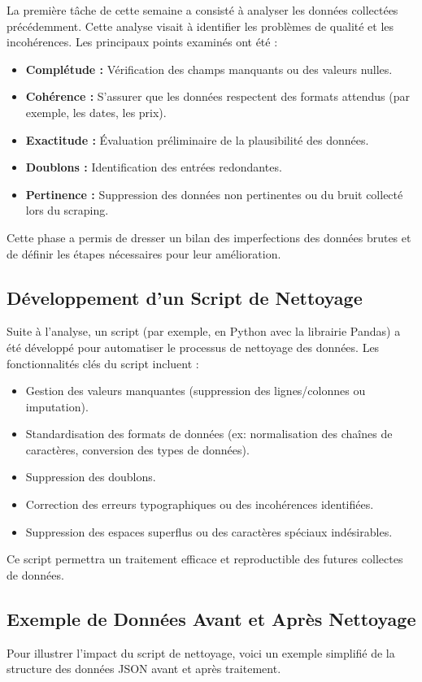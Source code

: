 \documentclass[12pt, a4paper]{article}
\begin{document}
La première tâche de cette semaine a consisté à analyser les données collectées précédemment. Cette analyse visait à identifier les problèmes de qualité et les incohérences. Les principaux points examinés ont été :
\begin{itemize}
  \item \textbf{Complétude :} Vérification des champs manquants ou des valeurs nulles.
  \item \textbf{Cohérence :} S'assurer que les données respectent des formats attendus (par exemple, les dates, les prix).
  \item \textbf{Exactitude :} Évaluation préliminaire de la plausibilité des données.
  \item \textbf{Doublons :} Identification des entrées redondantes.
  \item \textbf{Pertinence :} Suppression des données non pertinentes ou du bruit collecté lors du scraping.
\end{itemize}
Cette phase a permis de dresser un bilan des imperfections des données brutes et de définir les étapes nécessaires pour leur amélioration.

\subsection{Développement d'un Script de Nettoyage}

Suite à l'analyse, un script (par exemple, en Python avec la librairie Pandas) a été développé pour automatiser le processus de nettoyage des données. Les fonctionnalités clés du script incluent :
\begin{itemize}
  \item Gestion des valeurs manquantes (suppression des lignes/colonnes ou imputation).
  \item Standardisation des formats de données (ex: normalisation des chaînes de caractères, conversion des types de données).
  \item Suppression des doublons.
  \item Correction des erreurs typographiques ou des incohérences identifiées.
  \item Suppression des espaces superflus ou des caractères spéciaux indésirables.
\end{itemize}
Ce script permettra un traitement efficace et reproductible des futures collectes de données.

\subsection{Exemple de Données Avant et Après Nettoyage}
Pour illustrer l'impact du script de nettoyage, voici un exemple simplifié de la structure des données JSON avant et après traitement.
\end{document}
